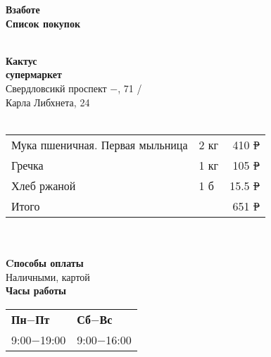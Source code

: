 \documentclass[12pt ]{extarticle}
\begin{document}
\begin{preview}

\begin{flushleft}


  \textbf{{\huge Взаботе} \\ 
    \vspace{0.5cm}
    {\large Список покупок}} \\
  \vspace{0.5cm}
  \hdashrule{6.5cm}{1pt}{}\\
  \vspace{0.5cm}
  \begin{trivlist} 
  \item
    \textbf{{\large Кактус} \\
      супермаркет}\\
    Свердловсикй проспект $-$, 71 /\\
    Карла Либхнета, 24\\
    \vspace{0.2cm}
    \hdashrule{6.5cm}{1pt}{1pt}\\
    \vspace{0.5cm}
    \begin{tabular}{p{3cm}p{1.2cm}r}
       Мука пшеничная. Первая мыльница  & 2 кг & 410 \sout{Р} \\
       Гречка  & 1 кг & 105 \sout{Р} \\
      Хлеб ржаной  & 1 б & 15.5 \sout{Р} \\
       Итого  &   & 651 \sout{Р} \\
    \end{tabular}\\
    \vspace{0.22cm}
    \hdashrule{6.5cm}{1pt}{1pt}\\
    \vspace{0.5cm}
    \textbf{Cпособы оплаты} \\
    Наличными, картой \\
    \vspace{0.5cm}
    \textbf{Часы работы} \\
    \begin{tabular}{p{3.2cm}p{3.2cm}}
       \textbf{Пн$-$Пт}  & \textbf{Сб$-$Вс} \\
       9:00$-$19:00 & 9:00$-$16:00 \\
    \end{tabular}\\
    \vspace{0.4cm}
    \hdashrule{6.5cm}{1pt}{}\\

\end{trivlist}
\end{flushleft}
\end{preview}
\end{document}
